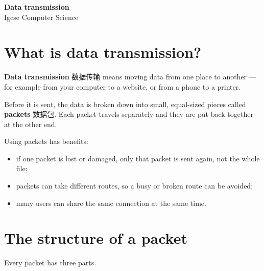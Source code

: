 \documentclass[11pt]{article}
\begin{document}
\begin{center}
  {\LARGE\bfseries Data transmission}\\[0.35em]
  {\large Igcse Computer Science}
\end{center}
\vspace{0.6em}

\section*{What is data transmission?}

\textbf{Data transmission} 数据传输 means moving data from one place to another — for example from your computer to a website, or from a phone to a printer.

Before it is sent, the data is broken down into small, equal-sized pieces called \textbf{packets} 数据包. Each packet travels separately and they are put back together at the other end.

Using packets has benefits:

\begin{itemize}
\item if one packet is lost or damaged, only that packet is sent again, not the whole file;

\item packets can take different routes, so a busy or broken route can be avoided;

\item many users can share the same connection at the same time.

\end{itemize}

\section*{The structure of a packet}

Every packet has three parts.

\begin{center}
\end{center}
\end{document}

